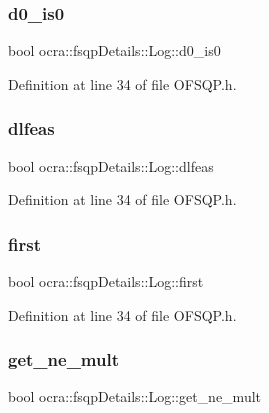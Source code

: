 \subsubsection{\texorpdfstring{d0\+\_\+is0}{d0\_is0}}
{\footnotesize\ttfamily bool ocra\+::fsqp\+Details\+::\+Log\+::d0\+\_\+is0}



Definition at line 34 of file O\+F\+S\+Q\+P.\+h.

\hypertarget{structocra_1_1fsqpDetails_1_1Log_ab99dfa8d9e4586ab424df50710ae3961}{}\label{structocra_1_1fsqpDetails_1_1Log_ab99dfa8d9e4586ab424df50710ae3961} 
\subsubsection{\texorpdfstring{dlfeas}{dlfeas}}
{\footnotesize\ttfamily bool ocra\+::fsqp\+Details\+::\+Log\+::dlfeas}



Definition at line 34 of file O\+F\+S\+Q\+P.\+h.

\hypertarget{structocra_1_1fsqpDetails_1_1Log_add5ea7abffed65d8e168c8f47317c9bc}{}\label{structocra_1_1fsqpDetails_1_1Log_add5ea7abffed65d8e168c8f47317c9bc} 
\subsubsection{\texorpdfstring{first}{first}}
{\footnotesize\ttfamily bool ocra\+::fsqp\+Details\+::\+Log\+::first}



Definition at line 34 of file O\+F\+S\+Q\+P.\+h.

\hypertarget{structocra_1_1fsqpDetails_1_1Log_aadc61b25f57b2277b7431ecedc29c6b4}{}\label{structocra_1_1fsqpDetails_1_1Log_aadc61b25f57b2277b7431ecedc29c6b4} 
\subsubsection{\texorpdfstring{get\+\_\+ne\+\_\+mult}{get\_ne\_mult}}
{\footnotesize\ttfamily bool ocra\+::fsqp\+Details\+::\+Log\+::get\+\_\+ne\+\_\+mult}



